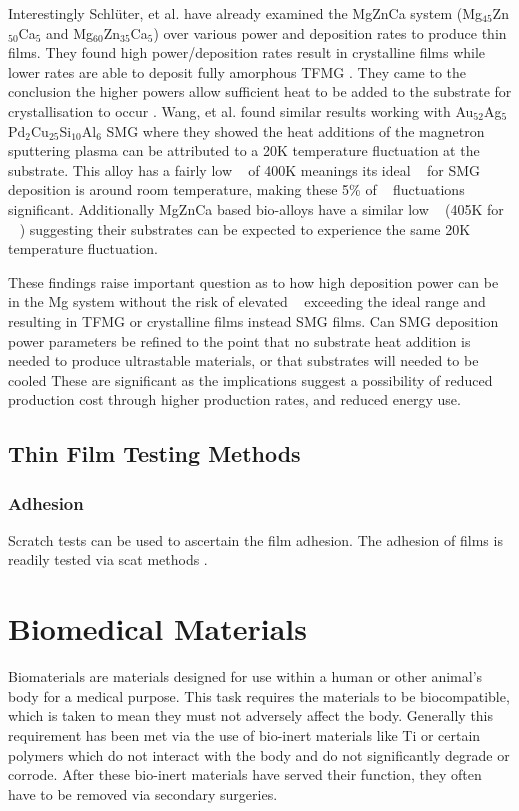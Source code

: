 \documentclass[draft,a4paper,12pt,oneside]{report}%
\begin{document}
Interestingly Schlüter, et al. \cite{Schluter2012} have already examined the MgZnCa system (Mg$_{45}$Zn$_{50}$Ca$_{5}$ and Mg$_{60}$Zn$_{35}$Ca$_{5}$) over various power and deposition rates to produce thin films. They found high power/deposition rates result in crystalline films while lower rates are able to deposit fully amorphous  TFMG \cite{Schluter2012}. They came to the conclusion the higher powers allow sufficient heat to be added to the substrate for crystallisation to occur \cite{Schluter2012}. Wang, et al. \cite{Wang2014} found similar results working with Au$_{52}$Ag$_{5}$Pd$_{2}$Cu$_{25}$Si$_{10}$Al$_{6}$ SMG where they showed the heat additions of the magnetron sputtering plasma can be attributed to a 20K temperature fluctuation at the substrate. This alloy has a fairly low \Tg~ of 400K meanings its ideal \Tsub~ for SMG deposition is around room temperature, making these 5\% of \Tg~ fluctuations significant. Additionally MgZnCa based bio-alloys have a similar low \Tg~ (405K for \MgZnCa~ \cite{Cao2013b, Gu2005}) suggesting their substrates can be expected to experience the same 20K temperature fluctuation. 

These findings raise important question as to how high deposition power can be in the Mg system without the risk of elevated \Tsub~ exceeding the ideal range and resulting in TFMG or crystalline films instead SMG films. Can SMG deposition power parameters be refined to the point that no substrate heat addition is needed to produce ultrastable materials, or that substrates will needed to be cooled These are significant as the implications suggest a possibility of reduced production cost through higher production rates, and reduced energy use. 
 
\subsection{Thin Film Testing Methods}
\subsubsection{Adhesion}
Scratch tests can be used to ascertain the film adhesion. 
The adhesion of films is readily tested via scat methods \cite{Bull1996, Burnett1987, Burnett1988, Pan2010}.

\section{Biomedical Materials} 
Biomaterials are materials designed for use within a human or other animal's body for a medical purpose. This task requires the materials to be biocompatible, which is taken to mean they must not adversely affect the body. Generally this requirement has been met via the use of bio-inert materials like Ti or certain polymers which do not interact with the body and do not significantly degrade or corrode. After these bio-inert materials have served their function, they often have to be removed via secondary surgeries.  
\end{document}
